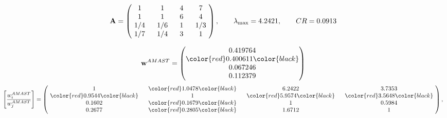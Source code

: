 \begin{example}
\begin{equation*}
\mathbf{A} =
\begin{pmatrix}
$\,\,$ 1 $\,\,$ & $\,\,$1$\,\,$ & $\,\,$4$\,\,$ & $\,\,$7 $\,\,$ \\
$\,\,$ 1 $\,\,$ & $\,\,$ 1 $\,\,$ & $\,\,$6$\,\,$ & $\,\,$4 $\,\,$ \\
$\,\,$ 1/4$\,\,$ & $\,\,$ 1/6$\,\,$ & $\,\,$ 1 $\,\,$ & $\,\,$ 1/3 $\,\,$ \\
$\,\,$ 1/7$\,\,$ & $\,\,$ 1/4$\,\,$ & $\,\,$3$\,\,$ & $\,\,$ 1  $\,\,$ \\
\end{pmatrix},
\qquad
\lambda_{\max} =
4.2421,
\qquad
CR = 0.0913
\end{equation*}

\begin{equation*}
\mathbf{w}^{AMAST} =
\begin{pmatrix}
0.419764\\
\color{red} 0.400611\color{black} \\
0.067246\\
0.112379
\end{pmatrix}\end{equation*}
\begin{equation*}
\left[ \frac{{w}^{AMAST}_i}{{w}^{AMAST}_j} \right] =
\begin{pmatrix}
$\,\,$ 1 $\,\,$ & $\,\,$\color{red} 1.0478\color{black} $\,\,$ & $\,\,$6.2422$\,\,$ & $\,\,$3.7353$\,\,$ \\
$\,\,$\color{red} 0.9544\color{black} $\,\,$ & $\,\,$ 1 $\,\,$ & $\,\,$\color{red} 5.9574\color{black} $\,\,$ & $\,\,$\color{red} 3.5648\color{black}   $\,\,$ \\
$\,\,$0.1602$\,\,$ & $\,\,$\color{red} 0.1679\color{black} $\,\,$ & $\,\,$ 1 $\,\,$ & $\,\,$0.5984 $\,\,$ \\
$\,\,$0.2677$\,\,$ & $\,\,$\color{red} 0.2805\color{black} $\,\,$ & $\,\,$1.6712$\,\,$ & $\,\,$ 1  $\,\,$ \\
\end{pmatrix},
\end{equation*}


\end{example}
